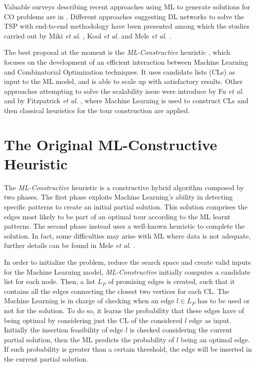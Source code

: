\documentclass{article}
\begin{document}
Valuable surveys describing recent approaches using ML to generate solutions for CO problems are in \cite{mele_survey, survey}.
Different approaches suggesting DL networks to solve the TSP with end-to-end methodology have been presented among which the studies carried out by Miki \emph{et al.} \cite{image_for_TSP}, Kool \emph{et al.} \cite{attention_for_VRP} and Mele \emph{et al.} \cite{mele_rl}.

The best proposal at the moment is the \emph{ML-Constructive} heuristic \cite{mele:gambardella:montemanni}, which focuses on the development of an efficient interaction between Machine Learning and Combinatorial Optimization techniques. 
It uses candidate lists (CLs) as input to the ML model, and is able to scale up with satisfactory results.
Other approaches attempting to solve the scalability issue were introduce by Fu \emph{et al.} \cite{generalize} and by Fitzpatrick \emph{et al.} \cite{ml_for_cl}, where Machine Learning is used to construct CLs and then classical heuristics for the tour construction are applied.

\section{The Original ML-Constructive Heuristic} \label{method}
The \emph{ML-Constructive} heuristic is a constructive hybrid algorithm composed by two phases. 
The first phase exploits Machine Learning's ability in detecting specific patterns to create an initial partial solution.
This solution comprises the edges most likely to be part of an optimal tour according to the ML learnt patterns.
The second phase instead uses a well-known heuristic to complete the solution.
In fact, some difficulties may arise with ML where data is not adequate, further details can be found in Mele \emph{et al.} \cite{mele:gambardella:montemanni}. 

\vspace{5 pt}

In order to initialize the problem, reduce the search space and create valid inputs for the Machine Learning model, \emph{ML-Constructive} initially computes a candidate list for each node. 
Then, a list $L_P$ of promising edges is created, such that it contains all the edges connecting the closest two vertices for each CL.
The Machine Learning is in charge of checking when an edge $l \in L_P$ has to be used or not for the solution.
To do so, it learns the probability that these edges 
have of being optimal by considering just the CL of the considered $l$ edge as input.
Initially the insertion feasibility of edge $l$ is checked considering the current partial solution, then the ML predicts the probability of $l$ being an optimal edge. 
If such probability is greater than a certain threshold, the edge will be inserted in the current partial solution.
\end{document}
